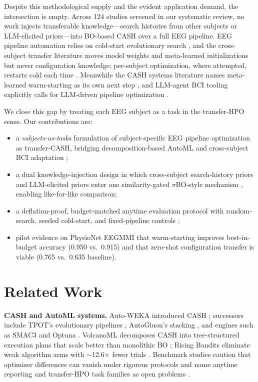 \documentclass[conference]{IEEEtran}
\begin{document}
Despite this methodological supply and the evident application demand, the intersection is empty. Across 124 studies screened in our systematic review, no work injects transferable knowledge---search histories from other subjects or LLM-elicited priors---into BO-based CASH over a full EEG pipeline. EEG pipeline automation relies on cold-start evolutionary search \cite{NakisaEtAl2018, ZhuEtAl2025}, and the cross-subject transfer literature moves model weights and meta-learned initializations \cite{BerdyshevEtAl2024, AristimunhaEtAl2025} but never configuration knowledge; per-subject optimization, where attempted, restarts cold each time \cite{ZhangEtAl2024}. Meanwhile the CASH systems literature names meta-learned warm-starting as its own next step \cite{LiEtAl2016, LiEtAl2020a, LiEtAl2022a}, and LLM-agent BCI tooling explicitly calls for LLM-driven pipeline optimization \cite{KapitonovaBall2024}.

We close this gap by treating each EEG subject as a task in the transfer-HPO sense. Our contributions are:
\begin{itemize}
    \item a \emph{subjects-as-tasks} formulation of subject-specific EEG pipeline optimization as transfer-CASH, bridging decomposition-based AutoML \cite{LiEtAl2021b} and cross-subject BCI adaptation \cite{BerdyshevEtAl2024};
    \item a dual knowledge-injection design in which cross-subject search-history priors and LLM-elicited priors enter one similarity-gated $\pi$BO-style mechanism \cite{HvarfnerEtAl2022}, enabling like-for-like comparison;
    \item a deflation-proof, budget-matched anytime evaluation protocol with random-search, seeded cold-start, and fixed-pipeline controls \cite{ZollerHuber2019, RodriguesEtAl2026};
    \item pilot evidence on PhysioNet EEGMMI that warm-starting improves best-in-budget accuracy (0.950 vs.\ 0.915) and that zero-shot configuration transfer is viable (0.765 vs.\ 0.635 baseline).
\end{itemize}

\section{Related Work}
\label{sec:related}

\textbf{CASH and AutoML systems.} Auto-WEKA introduced CASH \cite{KotthoffEtAl2019}; successors include TPOT's evolutionary pipelines \cite{OlsonEtAl2016}, AutoGluon's stacking \cite{EricksonEtAl2020}, and engines such as SMAC3 \cite{LindauerEtAl2021} and Optuna \cite{AkibaEtAl2019}. VolcanoML decomposes CASH into tree-structured execution plans that scale better than monolithic BO \cite{LiEtAl2021b, LiEtAl2022a}; Rising Bandits eliminate weak algorithm arms with $\sim$12.6$\times$ fewer trials \cite{LiEtAl2020a}. Benchmark studies caution that optimizer differences can vanish under rigorous protocols \cite{ZollerHuber2019} and name anytime reporting and transfer-HPO task families as open problems \cite{GijsbersEtAl2019, EggenspergerEtAl2021}.
\end{document}

